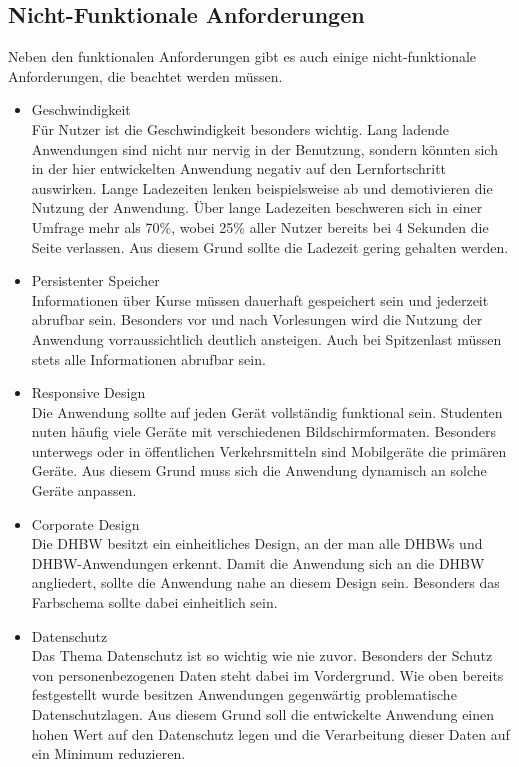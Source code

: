 \subsection{Nicht-Funktionale Anforderungen}
Neben den funktionalen Anforderungen gibt es auch einige nicht-funktionale Anforderungen, die beachtet werden müssen.
\begin{itemize}
    \item Geschwindigkeit\\
        Für Nutzer ist die Geschwindigkeit besonders wichtig.
        Lang ladende Anwendungen sind nicht nur nervig in der Benutzung, sondern könnten sich in der hier entwickelten Anwendung negativ auf den Lernfortschritt auswirken. Lange Ladezeiten lenken beispielsweise ab und demotivieren die Nutzung der Anwendung.
        Über lange Ladezeiten beschweren sich in einer Umfrage mehr als 70\%, wobei 25\% aller Nutzer bereits bei 4 Sekunden die Seite verlassen.\autocite{loadingTimes}
        Aus diesem Grund sollte die Ladezeit gering gehalten werden.
    \item Persistenter Speicher             \\
        Informationen über Kurse müssen dauerhaft gespeichert sein und jederzeit abrufbar sein.
        Besonders vor und nach Vorlesungen wird die Nutzung der Anwendung vorraussichtlich deutlich ansteigen.
        Auch bei Spitzenlast müssen stets alle Informationen abrufbar sein.
    \item Responsive Design\\
        Die Anwendung sollte auf jeden Gerät vollständig funktional sein.
        Studenten nuten häufig viele Geräte mit verschiedenen Bildschirmformaten.
        Besonders unterwegs oder in öffentlichen Verkehrsmitteln sind Mobilgeräte die primären Geräte.
        Aus diesem Grund muss sich die Anwendung dynamisch an solche Geräte anpassen.
    \item Corporate Design\\
        Die DHBW besitzt ein einheitliches Design, an der man alle DHBWs und DHBW-Anwendungen erkennt.
        Damit die Anwendung sich an die DHBW angliedert, sollte die Anwendung nahe an diesem Design sein.
        Besonders das Farbschema sollte dabei einheitlich sein.
    \item Datenschutz\\
        Das Thema Datenschutz ist so wichtig wie nie zuvor.
        Besonders der Schutz von personenbezogenen Daten steht dabei im Vordergrund.
        Wie oben bereits festgestellt wurde besitzen Anwendungen gegenwärtig problematische Datenschutzlagen.
        Aus diesem Grund soll die entwickelte Anwendung einen hohen Wert auf den Datenschutz legen und die Verarbeitung dieser Daten auf ein Minimum reduzieren.
\end{itemize}



